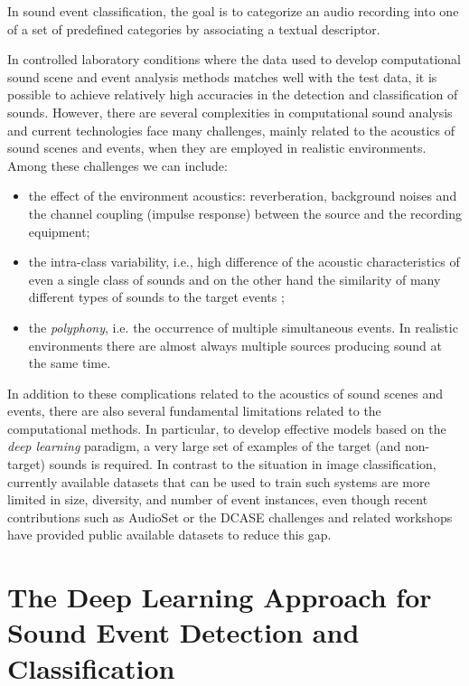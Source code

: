 In sound event classification, the goal is to categorize an audio recording into one of a set of predefined categories by associating a textual descriptor.

In controlled laboratory conditions where the data used to develop computational sound scene and event analysis methods matches well with the test data, it is possible to achieve relatively high accuracies in the detection and classification of sounds.  However, there are several complexities in computational sound analysis and current technologies face many challenges, mainly related to the acoustics of sound scenes and events, when they are employed in realistic environments.
Among these challenges we can include:
\begin{itemize}
	\item the effect of the environment acoustics: reverberation, background noises and the channel coupling (impulse response) between the source and the recording equipment;
	\item the intra-class variability, i.e., high difference of the acoustic characteristics of even a single class of sounds and on the other hand the similarity of many different types of sounds to the target events  \cite{stowell2015acoustic};
	\item the \textit{polyphony}, i.e. the occurrence of multiple simultaneous events. In realistic environments there
are almost always multiple sources producing sound at the same time. 
\end{itemize}

In addition to these complications related to the acoustics of sound scenes and
events, there are also several fundamental limitations related to the computational methods. In particular, to develop effective models based on the \textit{deep learning} paradigm, a very large set of examples of the
target (and non-target) sounds is required. In contrast to the situation in image classification,
 currently available datasets that can be used to train such systems are more limited in size, diversity, and number of event
 instances, even though recent contributions such as AudioSet \cite{gemmeke2017audio} or the DCASE challenges
and related workshops \cite{DCASE2017Workshop, mesaros2016tut, dcase2018web} have provided public available datasets to reduce this gap.



\section{The Deep Learning Approach for Sound Event Detection and Classification}

